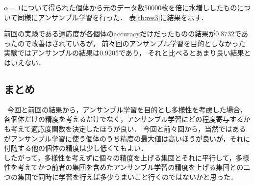 \documentclass[twocolumn]{jarticle}     %
\begin{document}
$\alpha = 1$について得られた個体から元のデータ数50000枚を倍に水増ししたものについて同様にアンサンブル学習を行った．
表\ref{tb:res3}に結果を示す．
\begin{table}[h]
	\centering
	\caption{最終結果\label{tb:res3}}
\end{table}
前回の実験である適応度が各個体のaccuracyだけだったものの結果が0.8732であったので改善はされているが，
前々回のアンサンブル学習を目的としなかった実験ではアンサンブルの結果は0.9205であり，
それと比べるとあまり良い結果とはいえない．

\subsection{まとめ}
\ 今回と前回の結果から，アンサンブル学習を目的とし多様性を考慮した場合，各個体だけの精度を考えるだけでなく，アンサンブル学習にどの程度寄与するかも考えて適応度関数を決定したほうが良い．
今回と前々回から，当然ではあるがアンサンブル学習に使う個体のうち精度の最大値は高いほうが良いが，それに付随する他の個体の精度は少し低くてもよい．\\
したがって，多様性を考えずに個々の精度を上げる集団とそれに平行して，多様性を考えてかつ前者の集団を含めたアンサンブル学習の精度を上げる集団との二つの集団で同時に学習を行えば多少うまいこと行くのではないかと思った．
\end{document}
